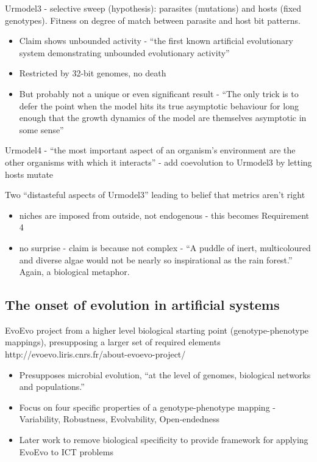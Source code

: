 Urmodel3 - selective sweep (hypothesis): parasites (mutations) and
hosts (fixed genotypes). Fitness on degree of match between parasite
and host bit patterns.

\begin{itemize}
	\item
	
	Claim shows unbounded activity - ``the first known artificial
	evolutionary system demonstrating unbounded evolutionary activity''
	
	\item
	
	Restricted by 32-bit genomes, no death
	
	\item
	
	But probably not a unique or even significant result - ``The only
	trick is to defer the point when the model hits its true asymptotic
	behaviour for long enough that the growth dynamics of the model are
	themselves asymptotic in some sense''
	
\end{itemize}

Urmodel4 - ``the most important aspect of an organism's environment
are the other organisms with which it interacts'' - add coevolution to
Urmodel3 by letting hosts mutate

Two ``distasteful aspects of Urmodel3'' leading to belief that metrics
aren't right

\begin{itemize}
	\item niches are imposed from outside, not endogenous - this becomes Requirement 4
	\item no surprise - claim is because not complex - ``A puddle of inert,
	multicoloured and diverse algae would not be nearly so inspirational
	as the rain forest.'' Again, a biological metaphor.	
\end{itemize}

\subsection{The onset of evolution in artificial systems}

EvoEvo project from a higher level biological starting point (genotype-phenotype mappings), presupposing a larger set of required elements
http://evoevo.liris.cnrs.fr/about-evoevo-project/

\begin{itemize}
	\item Presupposes microbial evolution, ``at the level of genomes, biological networks and populations.''
	\item Focus on four specific properties of a genotype-phenotype mapping - Variability, Robustness, Evolvability, Open-endedness
	\item Later work to remove biological specificity to provide framework for applying EvoEvo to ICT problems
\end{itemize}

